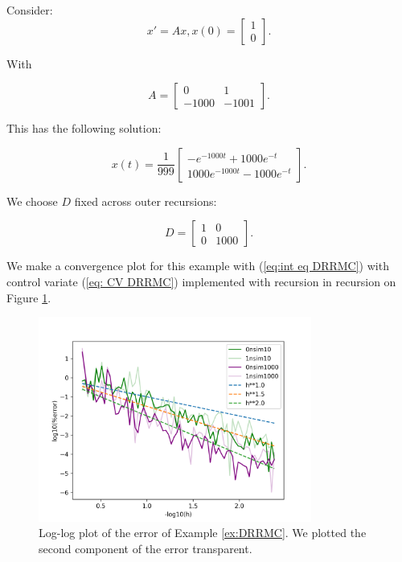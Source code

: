 \documentclass[a4paper,12pt]{article}
\begin{document}
\begin{example}[DRRMC] \label{ex:DRRMC}
    Consider:
    \begin{equation}
        x'= Ax, x(0)=
        \begin{bmatrix}
            1 \\
            0
        \end{bmatrix}.
    \end{equation}

    With

    \begin{equation}
        A = \begin{bmatrix}
            0     & 1     \\
            -1000 & -1001
        \end{bmatrix}.
    \end{equation}

    This has the following solution:

    \begin{equation}
        x(t) = \frac{1}{999}
        \begin{bmatrix}
            -  e^{-1000t}+ 1000 e^{-t} \\
            1000 e^{-1000t}- 1000e^{-t}
        \end{bmatrix}.
    \end{equation}

    We choose $D$ fixed across outer recursions:

    \begin{equation}
        D = \begin{bmatrix}
            1 & 0    \\
            0 & 1000
        \end{bmatrix}.
    \end{equation}

    We make a convergence plot for this example with
    (\ref{eq:int eq DRRMC}) with control variate
    (\ref{eq: CV DRRMC}) implemented with recursion in recursion
    on Figure \ref{fig:DRRMC}.

    \begin{figure}[h!]
        \centering
        \includegraphics[width=0.8\textwidth]{plots/DRRMC.png}
        \caption{Log-log plot of the error of Example \ref{ex:DRRMC}.
            We plotted the second component of the error transparent.
        }
        \label{fig:DRRMC}
    \end{figure}


\end{example}
\end{document}
